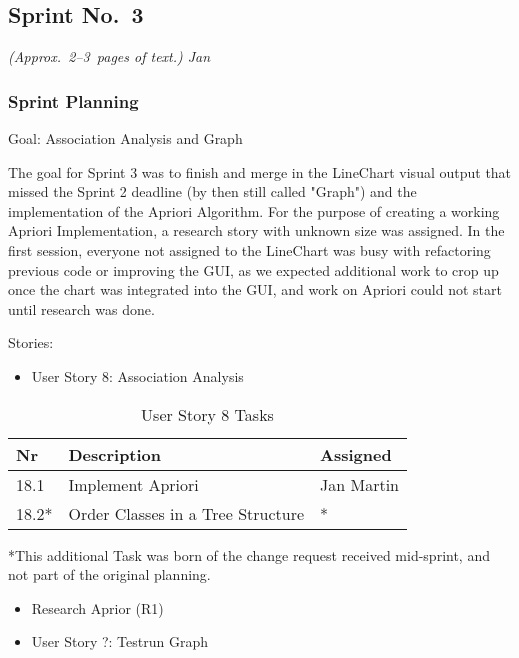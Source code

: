\subsection{Sprint No.~3}

\emph{(Approx.~2--3~pages of text.) Jan}

\subsubsection*{Sprint Planning}

Goal: Association Analysis and Graph

The goal for Sprint 3 was to finish and merge in the LineChart visual output that missed the Sprint 2 deadline (by then still called "Graph") and the implementation of the Apriori Algorithm. 
For the purpose of creating a working Apriori Implementation, a research story with unknown size was assigned. 
In the first session, everyone not assigned to the LineChart was busy with refactoring previous code or improving the GUI, as we expected additional work to crop up once the chart was integrated into the GUI, and work on Apriori could not start until research was done.

Stories: 

\begin{itemize}
	\item User Story 8: Association Analysis
	\end{itemize}
	
\begin{table}[h]
  \caption{User Story 8 Tasks}
  \label{Story 8 Tasks}
  \centering
  \begin{tabular}{p{1cm}|p{5cm}|p{3cm}|}
  	Nr & Description & Assigned \\ 
  	\hline
  	18.1 & Implement Apriori & Jan Martin \\ 
  	\hline
  	18.2* & Order Classes in a Tree Structure & * \\ 
  	\hline
  \end{tabular}
\end{table}
*This additional Task was born of the change request received mid-sprint, and not part of the original planning.
	
\begin{itemize}	
	\item Research Aprior (R1) 
\end{itemize}

\begin{itemize}
	\item User Story ?: Testrun Graph
	\end{itemize}
	
